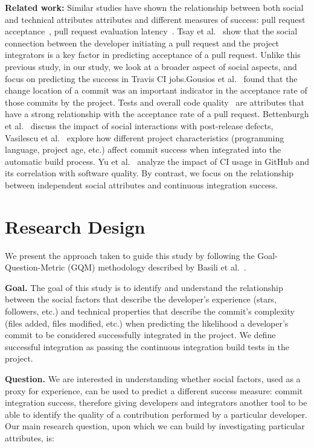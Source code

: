 \documentclass[10pt, conference]{IEEEtran}
\begin{document}
\vspace{1ex}
\noindent\textbf{Related work:}
Similar studies have shown the relationship between both social and technical attributes attributes and 
different measures of success: pull request acceptance~\cite{gousios14, 
gousios15,tsay14icse,tsay14fse}, pull request evaluation latency~\cite{Yu15}.
Tsay et al.~\cite{tsay14icse} 
show that the social connection between the developer initiating a
pull request and the project integrators is a key factor in predicting 
acceptance of a pull 
request. Unlike this previous study, in our study, we look at a broader aspect of 
social aspects, and focus on predicting the success in Travis
CI jobs.Gousios et al.~\cite{gousios14} found that the change location of a commit was
an important indicator in the acceptance rate of those commits by the project.
Tests and overall code quality~\cite{gousios15} are attributes that have a 
strong relationship with the acceptance rate of a pull request.
 Bettenburgh et 
al.~\cite{bettenburgh10} discuss the impact of social interactions with 
post-release defects, Vasilescu et al.~\cite{vasilescu14} explore how different 
project characteristics (programming language, project age, etc.) affect commit 
success when integrated into the automatic build process. Yu et al.~\cite{yu16} 
analyze the impact of CI usage in GitHub and its correlation with software 
quality. By contrast, we focus on the relationship between independent social 
attributes and continuous integration success. 

\section{Research Design}

We present the approach taken to guide this study by
following the Goal-Question-Metric (GQM) methodology described by Basili et 
al.~\cite{Basili84}.

\vspace{1ex}
\noindent\textbf{Goal.}
The goal of this study is to identify and understand the relationship 
between the social factors that describe the
developer's experience (stars, followers, etc.) and technical properties that
describe the commit's complexity
(files added, files modified, etc.)
when predicting the likelihood a developer's commit
to be considered successfully integrated in the project. We define successful
integration as passing the continuous integration build tests in the project.

\vspace{1ex}
\noindent\textbf{Question.}
We are interested in understanding whether
social factors, used as a proxy for experience, can be used to predict
a different success measure: commit integration success, therefore giving
developers and integrators another tool to be able to identify the quality
of a contribution performed by a particular developer.
%
Our main research question, upon which we can build by investigating particular attributes, is:
\end{document}
